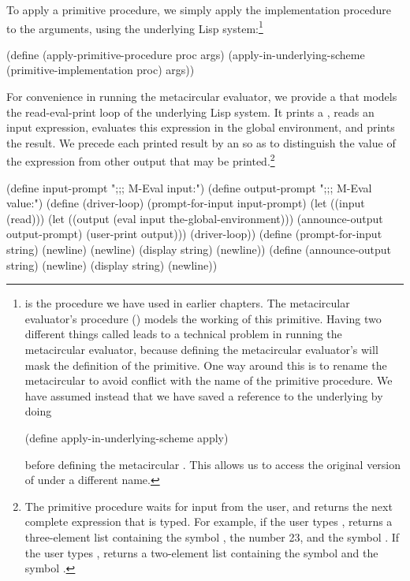 \noindent
To apply a primitive procedure, we simply apply the implementation procedure to
the arguments, using the underlying Lisp
system:\footnote{ is the 
procedure we have used in earlier chapters.  The metacircular evaluator's
 procedure () models the working of this
primitive.  Having two different things called  leads to a
technical problem in running the metacircular evaluator, because defining the
metacircular evaluator's  will mask the definition of the
primitive.  One way around this is to rename the metacircular  to
avoid conflict with the name of the primitive procedure.  We have assumed
instead that we have saved a reference to the underlying  by doing

\begin{compactCodeBlock}
(define apply-in-underlying-scheme apply)
\end{compactCodeBlock}

\noindent
before defining the metacircular .  This allows us to access the
original version of  under a different name.}

\begin{codeBlock}
(define (apply-primitive-procedure proc args)
  (apply-in-underlying-scheme
   (primitive-implementation proc) args))
\end{codeBlock}

\noindent
For convenience in running the metacircular evaluator, we provide a
 that models the read-eval-print loop of the underlying
Lisp system.  It prints a , reads an input expression,
evaluates this expression in the global environment, and prints the result.  We
precede each printed result by an  so as to distinguish
the value of the expression from other output that may be printed.\footnote{The
primitive procedure  waits for input from the user, and returns the
next complete expression that is typed.  For example, if the user types
,  returns a three-element list containing the symbol
\code{+}, the number 23, and the symbol .  If the user types ,
 returns a two-element list containing the symbol  and
the symbol .}

\begin{codeBlock}
(define input-prompt  ";;; M-Eval input:")
(define output-prompt ";;; M-Eval value:")
(define (driver-loop)
  (prompt-for-input input-prompt)
  (let ((input (read)))
    (let ((output (eval input the-global-environment)))
      (announce-output output-prompt)
      (user-print output)))
  (driver-loop))
(define (prompt-for-input string)
  (newline) (newline) (display string) (newline))
(define (announce-output string)
  (newline) (display string) (newline))
\end{codeBlock}

